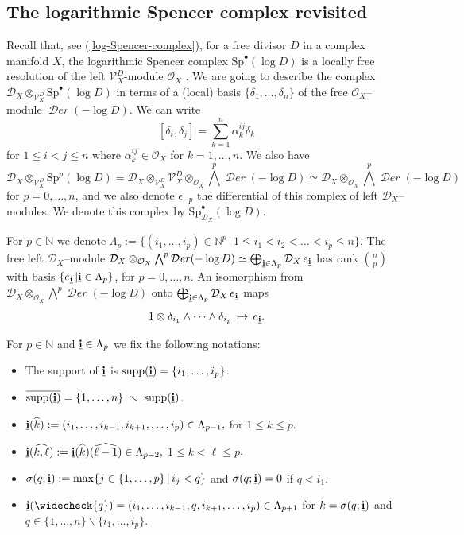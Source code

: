 \documentclass[12pt]{article}
\newcommand{\NN}{\mathbb{N}}
\newcommand{\ubi}{{\underline{{\bf i}}}}
\DeclareMathOperator{\fDer}{\mathcal{D}\mathit{er}}
\newcommand{\OO}{\mathcal{O}}
\newcommand{\DD}{\mathcal{D}}
\newcommand{\VV}{\mathcal{V}}
\newcommand{\Sp}{{\mathrm{Sp}}}
\newcommand{\cD}{\DD}
\newcommand{\cO}{\OO}
\newcommand\ssm{\smallsetminus}
\DeclareMathOperator{\supp}{\rm supp}
\begin{document}
\subsection{The logarithmic Spencer complex revisited}

Recall that, see (\ref{log-Spencer-complex}), for a free divisor $D$ in a complex manifold $X$, the logarithmic Spencer complex $\Sp^\bullet(\log D)$ is a locally free resolution of the left $\VV_X^D$-module $\OO_X$ \cite[Th. 3.1.2]{calde_ens}. We are going to
describe the complex
$\DD_X \otimes_{\VV_X^D} \Sp^\bullet(\log D)$ in terms of a (local) basis $\{\delta_1,\ldots,\delta_n\}$ of the free $\cO_X$--module $\fDer(-\log D)$.
We can write $$[\delta_i,\delta_j] = \sum_{k=1}^n \alpha_k^{ij}\delta_k$$ for $1\leq i<j\leq n$ where $\alpha_k^{ij} \in \cO_X$ for $k=1,\ldots,n$.
We also have $$\cD_X \otimes_{\VV_X^D} \Sp^p(\log D) = \cD_X \otimes_{\VV_X^D} {\VV_X^D} \otimes _{\cO_X} \bigwedge^p \fDer(-\log D) \simeq \cD_X \otimes _{\cO_X} \bigwedge^p \fDer(-\log D) $$ for $p=0,\ldots,n$, and we also denote $\epsilon_{-p}$ the differential of this complex of left $\cD_X$--modules.  We denote this complex by $\Sp^\bullet_{\cD_X}(\log D)$.

For $p\in \NN$ we denote  $\Lambda_p:= \{(i_1,\ldots, i_p)\in \NN^p\, \vert\, 1\leq i_1<i_2 < \ldots < i_p \leq n\}$. The free left $\cD_X$--module $\cD_X \otimes _{\cO_X} \bigwedge^p \fDer(-\log D)  \simeq \bigoplus_{\ubi \in \Lambda_p} \cD_X \,e_\ubi$ has rank $\binom{n}{p}$ with basis $\{e_\ubi \, \vert \ubi \in \Lambda_p \}$, for $p=0, \ldots,n$. An isomorphism
from $\cD_X \otimes _{\cO_X} \bigwedge^p \fDer(-\log D)$ onto $\bigoplus_{\ubi \in \Lambda_p} \cD_X \,e_\ubi$ maps $$1\otimes \delta_{i_1} \wedge \cdots \wedge \delta_{i_p} \,\mapsto\,  e_{\ubi}.$$

For $p\in \NN$ and $\ubi \in \Lambda_p$ we fix the following notations:
\begin{itemize}
\item The support of $\ubi$ is $\supp(\ubi) = \{i_1,\ldots,i_p\}$.
\item $\overline{\supp(\ubi)}=\{1,\ldots,n\}\,\, \ssm \,\, \supp(\ubi)$.
\item $\ubi(\widehat{k}) := (i_1,\ldots,i_{k-1}, i_{k+1}, \ldots,i_p)\in \Lambda_{p-1},$ for   $1\leq k \leq p$.
\item $\ubi(\widehat{k,\ell}) := \ubi(\widehat{k})(\widehat{\ell-1}) \in \Lambda_{p-2},$ $1\leq k <\ell  \leq p$.
\item $\sigma(q; \ubi) := \max\{j \in \{1,\ldots,p\}\, \vert \, i_j < q\}$ and $\sigma(q; \ubi)=0$ if $q < i_1$.
\item $\ubi(\widecheck{q}) = (i_1,\ldots,i_{k-1}, q, i_{k+1}, \ldots,i_p) \in \Lambda_{p+1}$ for $k= \sigma(q;\ubi)$ and $q\in\{1,\ldots,n\}\ssm \{i_1,\ldots,i_p\}$.
\end{itemize}
\end{document}
